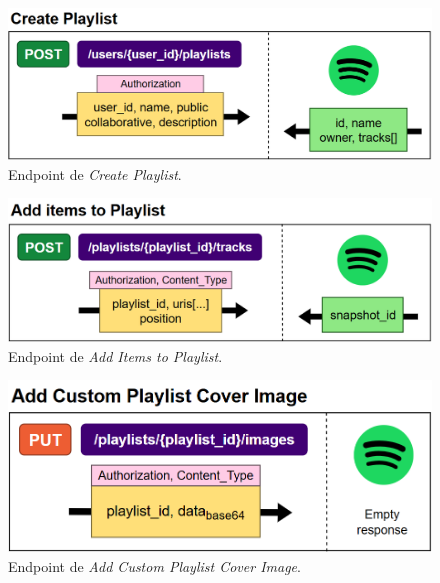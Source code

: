 \begin{figure}[H]
    \centering
    \includegraphics[width=\textwidth]{figures/endpoints/create_playlist.png}
    \caption{Endpoint de \textit{Create Playlist}.}
    \label{fig:create_playlist}
\end{figure}

\begin{figure}[H]
    \centering
    \includegraphics[width=\textwidth]{figures/endpoints/add_items_to_playlist.png}
    \caption{Endpoint de \textit{Add Items to Playlist}.}
    \label{fig:add_items_playlist}
\end{figure}

\begin{figure}[H]
    \centering
    \includegraphics[width=\textwidth]{figures/endpoints/add_custom_playlist_cover_image.png}
    \caption{Endpoint de \textit{Add Custom Playlist Cover Image}.}
    \label{fig:add_custom_playlist_cover_img}
\end{figure}






